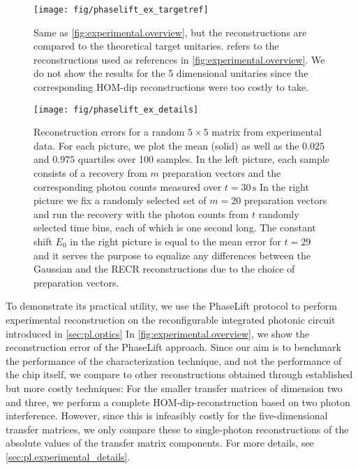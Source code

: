 \begin{figure*}[t]
  \centering
  \texttt{[image: fig/phaselift\_ex\_targetref]}
  \caption{%
     \label{fig:experimental.targetref}%
     Same as \cref{fig:experimental.overview}, but the reconstructions are compared to the theoretical target unitaries.
      refers to the reconstructions used as references in \cref{fig:experimental.overview}.
     We do not show the results for the 5 dimensional unitaries since the corresponding HOM-dip reconstructions were too costly to take.
  }
\end{figure*}
\begin{figure*}[t]
  \centering
  \texttt{[image: fig/phaselift\_ex\_details]}
  \caption{%
   \label{fig:pl.experimental.details}%
   Reconstruction errors for a random $5 \times 5$ matrix from experimental data.
   For each picture, we plot the mean (solid) as well as the $0.025$ and $0.975$ quartiles over 100 samples.
   In the left picture, each sample consists of a recovery from $m$ preparation vectors and the corresponding photon counts measured over $t = 30\,\mathrm{s}$
   In the right picture we fix a randomly selected set of $m=20$ preparation vectors and run the recovery with the photon counts from $t$ randomly selected time bins, each of which is one second long.
   The constant shift $E_0$ in the right picture is equal to the mean error for $t=29$ and it serves the purpose to equalize any differences between the Gaussian and the RECR reconstructions due to the choice of preparation vectors.
  }
\end{figure*}

To demonstrate its practical utility, we use the PhaseLift protocol to perform experimental reconstruction on the reconfigurable integrated photonic circuit introduced in \cref{sec:pl.optics}
In \cref{fig:experimental.overview}, we show the reconstruction error of the PhaseLift approach.
Since our aim is to benchmark the performance of the characterization technique, and not the performance of the chip itself, we compare to  other reconstructions obtained through established but more costly techniques:
For the smaller transfer matrices of dimension two and three, we perform a complete HOM-dip-reconstruction based on two photon interference.
However, since this is infeasibly costly for the five-dimensional transfer matrices, we only compare these to single-photon reconstructions of the absolute values of the transfer matrix components.
For more details, see \cref{sec:pl.experimental_details}.

